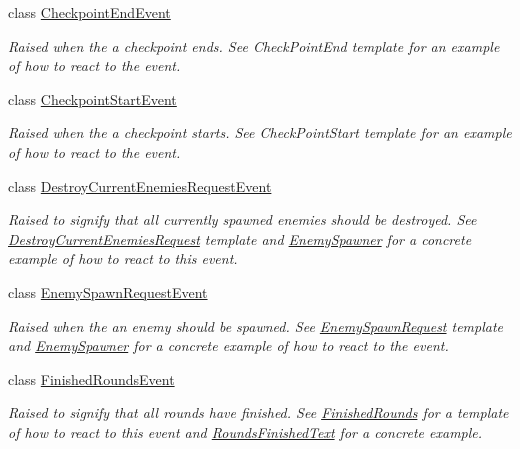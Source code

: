 \begin{DoxyCompactItemize}
class \hyperlink{class_round_manager_1_1_events_1_1_checkpoint_end_event}{Checkpoint\+End\+Event}
\begin{DoxyCompactList}\small\item\em Raised when the a checkpoint ends. See Check\+Point\+End template for an example of how to react to the event. \end{DoxyCompactList}\item 
class \hyperlink{class_round_manager_1_1_events_1_1_checkpoint_start_event}{Checkpoint\+Start\+Event}
\begin{DoxyCompactList}\small\item\em Raised when the a checkpoint starts. See Check\+Point\+Start template for an example of how to react to the event. \end{DoxyCompactList}\item 
class \hyperlink{class_round_manager_1_1_events_1_1_destroy_current_enemies_request_event}{Destroy\+Current\+Enemies\+Request\+Event}
\begin{DoxyCompactList}\small\item\em Raised to signify that all currently spawned enemies should be destroyed. See \hyperlink{class_round_manager_1_1_destroy_current_enemies_request}{Destroy\+Current\+Enemies\+Request} template and \hyperlink{class_round_manager_1_1_enemy_spawner}{Enemy\+Spawner} for a concrete example of how to react to this event. \end{DoxyCompactList}\item 
class \hyperlink{class_round_manager_1_1_events_1_1_enemy_spawn_request_event}{Enemy\+Spawn\+Request\+Event}
\begin{DoxyCompactList}\small\item\em Raised when the an enemy should be spawned. See \hyperlink{class_round_manager_1_1_enemy_spawn_request}{Enemy\+Spawn\+Request} template and \hyperlink{class_round_manager_1_1_enemy_spawner}{Enemy\+Spawner} for a concrete example of how to react to the event. \end{DoxyCompactList}\item 
class \hyperlink{class_round_manager_1_1_events_1_1_finished_rounds_event}{Finished\+Rounds\+Event}
\begin{DoxyCompactList}\small\item\em Raised to signify that all rounds have finished. See \hyperlink{class_round_manager_1_1_finished_rounds}{Finished\+Rounds} for a template of how to react to this event and \hyperlink{class_round_manager_1_1_rounds_finished_text}{Rounds\+Finished\+Text} for a concrete example. \end{DoxyCompactList}\item 

\end{DoxyCompactItemize}
